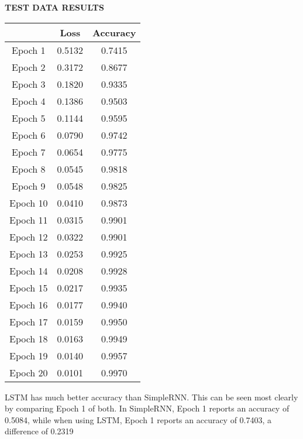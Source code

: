 \documentclass[12pt]{article}
\begin{document}
{\begin{center}\\
  \textbf{\\\\\\\\TEST DATA RESULTS}  
\end{center}
\begin{center}
\begin{tabular}{||c c c ||} 
 \hline
       & Loss & Accuracy \\ [0.5ex] 
 \hline\hline
 Epoch 1  & 0.5132   & 0.7415\\ 
 \hline
 Epoch 2 & 0.3172 & 0.8677\\
 \hline
 Epoch 3   & 0.1820     & 0.9335\\
 \hline
 Epoch 4  & 0.1386  & 0.9503\\
 \hline
 Epoch 5  & 0.1144 & 0.9595\\ 
 \hline
 Epoch 6 & 0.0790 & 0.9742\\
 \hline
 Epoch 7  & 0.0654  & 0.9775 \\
 \hline
 Epoch 8  & 0.0545 & 0.9818\\
 \hline
 Epoch 9  & 0.0548  & 0.9825 \\ 
 \hline
 Epoch 10 & 0.0410 & 0.9873\\
 \hline
 Epoch 11   & 0.0315  & 0.9901  \\
 \hline
 Epoch 12  & 0.0322  & 0.9901\\
 \hline
 Epoch 13  & 0.0253  & 0.9925  \\
 \hline
 Epoch 14 & 0.0208  & 0.9928\\ 
 \hline
 Epoch 15 & 0.0217 & 0.9935\\
 \hline
 Epoch 16   & 0.0177    & 0.9940\\
 \hline
 Epoch 17  & 0.0159  & 0.9950\\
 \hline
 Epoch 18  & 0.0163  & 0.9949\\
 \hline
 Epoch 19  & 0.0140 & 0.9957 \\
 \hline
  Epoch 20  & 0.0101  & 0.9970  \\
 \hline

\end{tabular}
\end{center}
\item LSTM has much better accuracy than SimpleRNN. This can be seen most clearly by comparing Epoch 1 of both. In SimpleRNN, Epoch 1 reports an accuracy of 0.5084, while when using LSTM, Epoch 1 reports an accuracy of 0.7403, a difference of 0.2319
}
\end{document}
